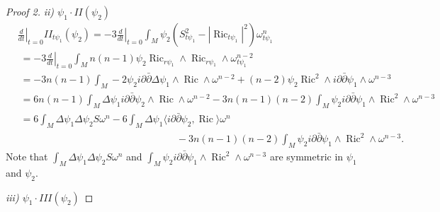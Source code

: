 \documentclass[12pt,reqno,a4paper]{amsart}
\numberwithin{equation}{section}
\def\p{\partial}
\def\bp{\bar\partial}
\DeclareMathOperator{\ric}{Ric}
\theoremstyle{remark}
\theoremstyle{dotless}
\begin{document}
\begin{proof}[Proof 2]
\vspace{5mm}
\textit{ii) $\psi_1\cdot II(\psi_2)$}
\begin{align}\label{final2}
&\left.\frac{d}{dt}\right|_{t=0}II_{t\psi_1}(\psi_2)= -3\left.\frac{d}{dt}\right|_{t=0}\int_M \psi_2 \left(S_{t\psi_1}^2-|\ric_{t\psi_1}|^2\right)\omega_{t\psi_1}^n \nonumber\\
&\;= -3\left.\frac{d}{dt}\right|_{t=0}\int_M n(n-1)\psi_2\ric_{r\psi_1}\wedge\ric_{r\psi_1}\wedge\omega_{t\psi_1}^{n-2} \nonumber\\
&\;=-3n(n-1)\int_M -2\psi_2i\p\bp\Delta\psi_1\wedge\ric\wedge\omega^{n-2}+(n-2)\psi_2\ric^2\wedge i\p\bp\psi_1\wedge\omega^{n-3} \nonumber\\
&\;=6n(n-1)\int_M \Delta\psi_1 i\p\bp\psi_2\wedge\ric\wedge\omega^{n-2}-3n(n-1)(n-2)\int_M \psi_2i\p\bp\psi_1\wedge\ric^2\wedge\omega^{n-3} \nonumber\\
&\;= 6 \int_M \Delta\psi_1 \Delta\psi_2 S \omega^n -6\int_M\Delta\psi_1\langle i\p\bp\psi_2,\ric \rangle\omega^n \nonumber\\
&\qquad\qquad\qquad\qquad\qquad\qquad\qquad\qquad-3n(n-1)(n-2)\int_M \psi_2i\p\bp\psi_1\wedge\ric^2\wedge\omega^{n-3}.
\end{align}
Note that $\int_M \Delta\psi_1 \Delta\psi_2 S \omega^n$ and $\int_M \psi_2i\p\bp\psi_1\wedge\ric^2\wedge\omega^{n-3}$ are symmetric in $\psi_1$ and $\psi_2$. 

\vspace{5mm}
\textit{iii) $\psi_1\cdot III(\psi_2)$}


\end{proof}
\end{document}
